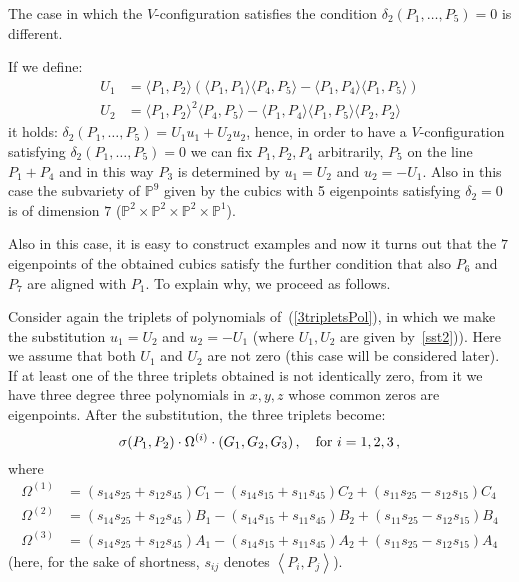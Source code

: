 \documentclass[11pt, a4paper, reqno, captions=tableheading,bibliography=totoc]{scrartcl}
\theoremstyle{plain}
\theoremstyle{definition}
\newcommand{\scl}[2]{\left\langle {#1}, {#2} \right\rangle}
\begin{document}
The case in which the $V$-configuration satisfies the condition
$\delta_2(P_1, \dots, P_5) = 0$ is different.

If we define:
\begin{equation}
  \begin{split}
    U_1 & =  \langle P_1, P_2\rangle \left(\langle P_1, P_1\rangle
  \langle P_4,P_5\rangle - \langle P_1, P_4\rangle \langle P_1, P_5\rangle
  \right)\\
  U_2 & =  \langle P_1, P_2\rangle^2\langle P_4, P_5\rangle
  -\langle P_1, P_4\rangle \langle P_1, P_5\rangle \langle P_2, P_2\rangle
  \label{sst2}
  \end{split}
\end{equation}
it holds: $\delta_2(P_1, \dots, P_5) = U_1u_1+U_2u_2$, hence, in order to
have a $V$-configuration satisfying $\delta_2(P_1, \dots, P_5) = 0$ we can
fix $P_1, P_2, P_4$ arbitrarily, $P_5$ on the line $P_1+P_4$ and in this
way $P_3$ is determined by $u_1 = U_2$ and $u_2 = -U_1$. Also in this case
the subvariety of $\mathbb{P}^9$ given by the cubics with 5
eigenpoints satisfying $\delta_2 = 0$ is of dimension $7$
($\mathbb{P}^2\times \mathbb{P}^2 \times \mathbb{P}^2\times \mathbb{P}^1$).

Also in this case, it is easy to construct examples and now it turns out that
the $7$ eigenpoints of the obtained cubics satisfy the further
condition that also $P_6$ and  $P_7$ are aligned with $P_1$. To explain
why, we proceed as follows.

Consider again the
triplets of polynomials of~(\ref{3tripletsPol}), in which we make the
substitution $u_1 = U_2$ and $u_2 = -U_1$ (where $U_1, U_2$ are
given by~\ref{sst2})). Here we
assume that both $U_1$ and $U_2$ are not zero (this case will be considered
later). If at least one of the three triplets obtained is not identically
zero, from it we have three degree three polynomials in $x, y, z$ whose
common zeros are eigenpoints.
After the substitution, the three triplets become:
%
\begin{equation}
\sigma(P_1, P_2) \cdot \Omega^{(i)} \cdot  \left(G_1, G_2, G_3\right),\quad
\hbox{for } i = 1, 2, 3 \,,
\label{G1G2G3}
\end{equation}
%
where
%
\begin{equation}
\label{3_Omega}
  \begin{split}
  \Omega^{(1)} & = (s_{14} s_{25} + s_{12} s_{45}) C_{1}
- (s_{14}s_{15}+s_{11}s_{45})C_{2} +(s_{11} s_{25}- s_{12} s_{15})C_4 \\
  \Omega^{(2)} & = (s_{14} s_{25} + s_{12} s_{45}) B_{1}
- (s_{14} s_{15} + s_{11} s_{45}) B_{2} +(s_{11} s_{25} - s_{12} s_{15}) B_{4} \\
  \Omega^{(3)} & = (s_{14} s_{25} + s_{12} s_{45}) A_{1}
- (s_{14} s_{15} +s_{11} s_{45})A_{2} +(s_{11} s_{25}-s_{12} s_{15})A_{4}
\end{split}
\end{equation}
%
(here, for the sake of shortness, $s_{ij}$ denotes $\scl{P_i}{P_j}$).
\end{document}
